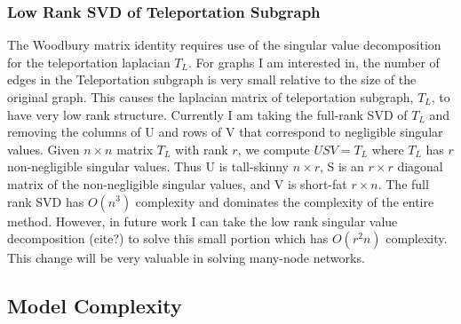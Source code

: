 \documentclass{article}
\begin{document}
\subsubsection{Low Rank SVD of Teleportation Subgraph}
The Woodbury matrix identity requires use of the singular value decomposition for the teleportation laplacian $T_L$. For graphs I am interested in, the number of edges in the Teleportation subgraph is very small relative to the size of the original graph. This causes the laplacian matrix of teleportation subgraph, $T_L$, to have very low rank structure. Currently I am taking the full-rank SVD of $T_L$ and removing the columns of U and rows of V that correspond to negligible singular values. Given $n\times n$ matrix $T_L$ with rank $r$, we compute $USV = T_L$ where $T_L$ has $r$ non-negligible singular values. Thus U is tall-skinny $n\times r$, S is an $r\times r$ diagonal matrix of the non-negligible singular values, and V is short-fat $r\times n$. The full rank SVD has $O(n^3)$ complexity and dominates the complexity of the entire method. However, in future work I can take the low rank singular value decomposition (cite?) to solve this small portion which has $O(r^2 n)$ complexity. This change will be very valuable in solving many-node networks.

\subsection{Model Complexity}
\end{document}
